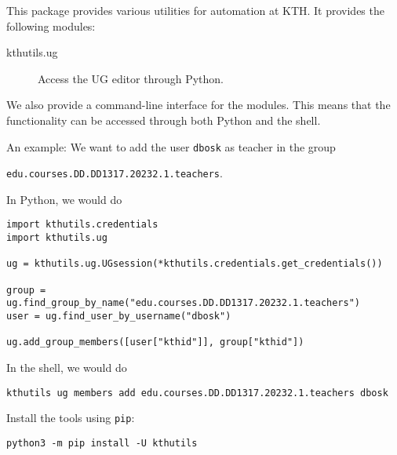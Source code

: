 This package provides various utilities for automation at KTH.
It provides the following modules:
\begin{description}
  \item[kthutils.ug] Access the UG editor through Python.
\end{description}

We also provide a command-line interface for the modules.
This means that the functionality can be accessed through both Python and the 
shell.

An example:
We want to add the user \texttt{dbosk} as teacher in the 
group
\begin{center}
  \texttt{edu.courses.DD.DD1317.20232.1.teachers}.
\end{center}

In Python, we would do
\begin{verbatim}
import kthutils.credentials
import kthutils.ug

ug = kthutils.ug.UGsession(*kthutils.credentials.get_credentials())

group = ug.find_group_by_name("edu.courses.DD.DD1317.20232.1.teachers")
user = ug.find_user_by_username("dbosk")

ug.add_group_members([user["kthid"]], group["kthid"])
\end{verbatim}

In the shell, we would do
\begin{verbatim}
kthutils ug members add edu.courses.DD.DD1317.20232.1.teachers dbosk
\end{verbatim}

Install the tools using \texttt{pip}:
\begin{verbatim}
python3 -m pip install -U kthutils
\end{verbatim}
